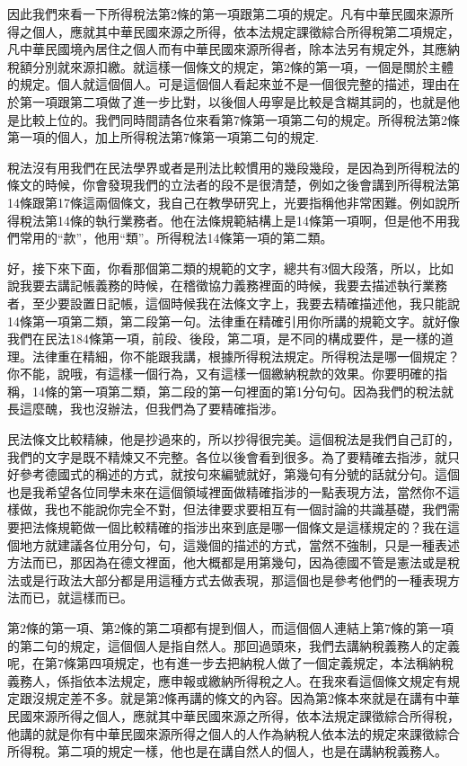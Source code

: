 \documentclass[]{ctexbook}
\begin{document}
因此我們來看一下所得稅法第2條的第一項跟第二項的規定。凡有中華民國來源所得之個人，應就其中華民國來源之所得，依本法規定課徵綜合所得稅第二項規定，凡中華民國境內居住之個人而有中華民國來源所得者，除本法另有規定外，其應納稅額分別就來源扣繳。就這樣一個條文的規定，第2條的第一項，一個是關於主體的規定。個人就這個個人。可是這個個人看起來並不是一個很完整的描述，理由在於第一項跟第二項做了進一步比對，以後個人毋寧是比較是含糊其詞的，也就是他是比較上位的。我們同時間請各位來看第7條第一項第二句的規定。所得稅法第2條第一項的個人，加上所得稅法第7條第一項第二句的規定.

稅法沒有用我們在民法學界或者是刑法比較慣用的幾段幾段，是因為到所得稅法的條文的時候，你會發現我們的立法者的段不是很清楚，例如之後會講到所得稅法第14條跟第17條這兩個條文，我自己在教學研究上，光要指稱他非常困難。例如說所得稅法第14條的執行業務者。他在法條規範結構上是14條第一項啊，但是他不用我們常用的``款''，他用``類''。所得稅法14條第一項的第二類。

好，接下來下面，你看那個第二類的規範的文字，總共有3個大段落，所以，比如說我要去講記帳義務的時候，在稽徵協力義務裡面的時候，我要去描述執行業務者，至少要設置日記帳，這個時候我在法條文字上，我要去精確描述他，我只能說14條第一項第二類，第二段第一句。法律重在精確引用你所講的規範文字。就好像我們在民法184條第一項，前段、後段，第二項，是不同的構成要件，是一樣的道理。法律重在精細，你不能跟我講，根據所得稅法規定。所得稅法是哪一個規定？你不能，說哦，有這樣一個行為，又有這樣一個繳納稅款的效果。你要明確的指稱，14條的第一項第二類，第二段的第一句裡面的第1分句句。因為我們的稅法就長這麼醜，我也沒辦法，但我們為了要精確指涉。

民法條文比較精練，他是抄過來的，所以抄得很完美。這個稅法是我們自己訂的，我們的文字是既不精煉又不完整。各位以後會看到很多。為了要精確去指涉，就只好參考德國式的稱述的方式，就按句來編號就好，第幾句有分號的話就分句。這個也是我希望各位同學未來在這個領域裡面做精確指涉的一點表現方法，當然你不這樣做，我也不能說你完全不對，但法律要求要相互有一個討論的共識基礎，我們需要把法條規範做一個比較精確的指涉出來到底是哪一個條文是這樣規定的？我在這個地方就建議各位用分句，句，這幾個的描述的方式，當然不強制，只是一種表述方法而已，那因為在德文裡面，他大概都是用第幾句，因為德國不管是憲法或是稅法或是行政法大部分都是用這種方式去做表現，那這個也是參考他們的一種表現方法而已，就這樣而已。

第2條的第一項、第2條的第二項都有提到個人，而這個個人連結上第7條的第一項的第二句的規定，這個個人是指自然人。那回過頭來，我們去講納稅義務人的定義呢，在第7條第四項規定，也有進一步去把納稅人做了一個定義規定，本法稱納稅義務人，係指依本法規定，應申報或繳納所得稅之人。在我來看這個條文規定有規定跟沒規定差不多。就是第2條再講的條文的內容。因為第2條本來就是在講有中華民國來源所得之個人，應就其中華民國來源之所得，依本法規定課徵綜合所得稅，他講的就是你有中華民國來源所得之個人的人作為納稅人依本法的規定來課徵綜合所得稅。第二項的規定一樣，他也是在講自然人的個人，也是在講納稅義務人。
\end{document}
